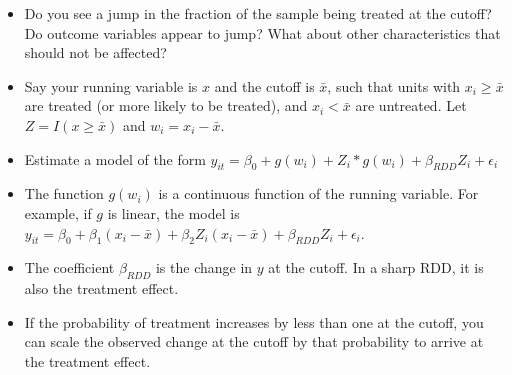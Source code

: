 \documentclass[10pt,a4paper]{protocol}
\begin{document}

\begin{itemize}
	\item Do you see a jump in the fraction of the sample being treated at the cutoff?
	Do outcome variables appear to jump? What about other characteristics that should not be affected?
\end{itemize}
\divider

\begin{itemize}
    \item Say your running variable is $x$ and the cutoff is $\bar{x}$, such that units with $x_i \geq \bar{x}$ are treated (or more likely to be treated), and $x_i < \bar{x}$ are untreated. Let $Z=I(x \geq \bar{x})$ and $w_i=x_i-\bar{x}$.
	\item Estimate a model of the form $y_{it}=\beta_0 + g(w_i) + Z_i*g(w_i)+ \beta_{RDD} Z_i + \epsilon_i $
	\item The function $g(w_i)$ is a continuous function of the running variable. For example, if $g$ is linear, the model is $y_{it}=\beta_0 + \beta_1 (x_i - \bar{x}) + \beta_2 Z_i (x_i - \bar{x}) + \beta_{RDD} Z_i + \epsilon_i$.
	\item The coefficient $\beta_{RDD}$ is the change in $y$ at the cutoff. In a sharp RDD, it is also the treatment effect.
	\item If the probability of treatment increases by less than one at the cutoff, you can scale the observed change at the cutoff by that probability to arrive at the treatment effect.
\end{itemize}
\divider



\clearpage


\nocite{*}

\printbibliography


\divider


\end{document}
